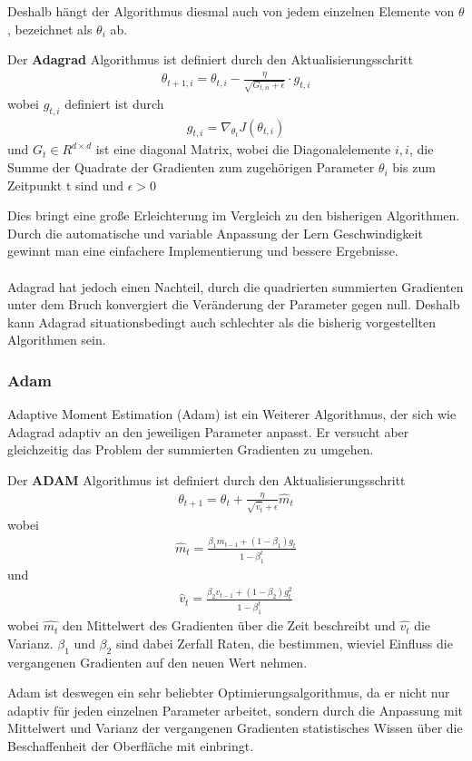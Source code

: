 Deshalb hängt der Algorithmus diesmal auch von jedem einzelnen Elemente von $\theta$,
 bezeichnet als $\theta_i$ ab.
 
\begin{definition}
    \cite[Kapitel 4.3]{Ruder.9152016}
    Der \textbf{Adagrad} Algorithmus ist definiert durch den Aktualisierungsschritt
    \begin{align}
        \theta_{t+1,i} = \theta_{t,i} - \frac{\eta}{\sqrt{G_{t,ii}+\epsilon}} \cdot g_{t,i}
    \end{align}
    wobei $g_{t,i}$ definiert ist durch
    \begin{align}
        g_{t,i} = \nabla_{\theta_t} J(\theta_{t,i})
    \end{align}
    und $G_t \in R^{d\times d}$ ist eine diagonal Matrix, wobei die Diagonalelemente $i,i$, die 
    Summe der Quadrate der Gradienten zum zugehörigen Parameter $\theta_i$ bis zum Zeitpunkt
    t sind und $\epsilon > 0$ 
    
\end{definition}

Dies bringt eine große Erleichterung im Vergleich zu den bisherigen Algorithmen.
Durch die automatische und variable Anpassung der Lern Geschwindigkeit gewinnt man 
eine einfachere Implementierung und bessere Ergebnisse. 
\\\\
Adagrad hat jedoch einen Nachteil, durch die quadrierten summierten Gradienten
unter dem Bruch konvergiert die Veränderung der Parameter gegen null.
Deshalb kann Adagrad situationsbedingt auch schlechter als 
die bisherig vorgestellten Algorithmen sein. 

\subsubsection{Adam}\label{Adam}
\cite{DiederikP.KingmaandJimmyLeiBa.2015}
Adaptive Moment Estimation (Adam) ist ein Weiterer Algorithmus, 
der sich wie Adagrad adaptiv an den jeweiligen Parameter anpasst.
Er versucht aber gleichzeitig das Problem der summierten Gradienten 
zu umgehen. 

\begin{definition}
    Der \textbf{ADAM} Algorithmus ist definiert durch
    den Aktualisierungsschritt
    \begin{align}
        \theta_{t+1} = \theta_t +\frac{\eta}{\sqrt{\hat{v}_t}+\epsilon}\hat{m}_t
    \end{align}
    wobei 
    \begin{align}
        \hat{m}_t = \frac{\beta_1 m_{t-1} + (1- \beta_1) g_t}{1-\beta^t_1}
    \end{align}
    und
    \begin{align}
        \hat{v}_t = \frac{\beta_2 v_{t-1} + (1- \beta_2) g_t^2}{1-\beta^t_1}
    \end{align}
    wobei $\hat{m_t}$ den Mittelwert des Gradienten über die Zeit beschreibt
    und $\hat{v_t}$ die Varianz. 
    $\beta_1$ und $\beta_2$ sind dabei Zerfall Raten, die bestimmen,
    wieviel Einfluss die vergangenen Gradienten auf den neuen Wert nehmen.
\end{definition}

Adam ist deswegen ein sehr beliebter Optimierungsalgorithmus, da er nicht nur 
adaptiv für jeden einzelnen Parameter arbeitet, sondern durch die Anpassung mit 
Mittelwert und Varianz der vergangenen Gradienten statistisches Wissen über
die Beschaffenheit der Oberfläche mit einbringt.

